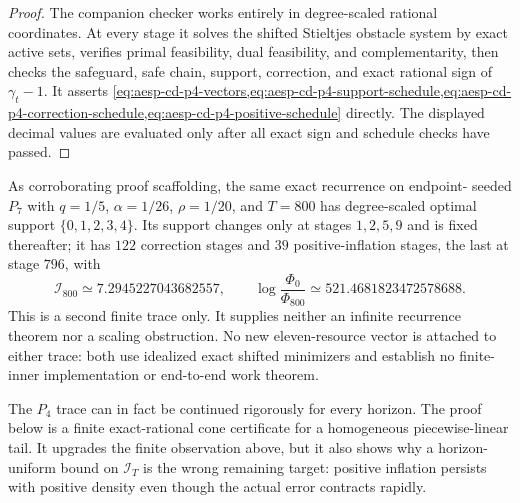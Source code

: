 \begin{proof}
The companion checker works entirely in degree-scaled rational coordinates.
At every stage it solves the shifted Stieltjes obstacle system by exact active
sets, verifies primal feasibility, dual feasibility, and complementarity,
then checks the safeguard, safe chain, support, correction, and exact rational
sign of $\gamma_t-1$.  It asserts
\cref{eq:aesp-cd-p4-vectors,eq:aesp-cd-p4-support-schedule,eq:aesp-cd-p4-correction-schedule,eq:aesp-cd-p4-positive-schedule}
directly.  The displayed decimal values are evaluated only after all exact
sign and schedule checks have passed.
\end{proof}

As corroborating proof scaffolding, the same exact recurrence on endpoint-
seeded $P_7$ with $q=1/5$, $\alpha=1/26$, $\rho=1/20$, and $T=800$ has
degree-scaled optimal support $\{0,1,2,3,4\}$.  Its support changes only at
stages $1,2,5,9$ and is fixed thereafter; it has $122$ correction stages and
$39$ positive-inflation stages, the last at stage $796$, with
\begin{equation}
 \mathcal I_{800}\simeq7.2945227043682557,
 \qquad
 \log\frac{\Phi_0}{\Phi_{800}}
 \simeq521.4681823472578688.
 \label{eq:aesp-cd-p7-scaffolding}
\end{equation}
This is a second finite trace only.  It supplies neither an infinite
recurrence theorem nor a scaling obstruction.  No new eleven-resource vector
is attached to either trace: both use idealized exact shifted minimizers and
establish no finite-inner implementation or end-to-end work theorem.

The $P_4$ trace can in fact be continued rigorously for every horizon.  The
proof below is a finite exact-rational cone certificate for a homogeneous
piecewise-linear tail.  It upgrades the finite observation above, but it also
shows why a horizon-uniform bound on $\mathcal I_T$ is the wrong remaining
target: positive inflation persists with positive density even though the
actual error contracts rapidly.

